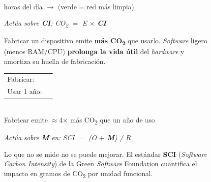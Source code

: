 \begin{figure}[htbp]
\begin{tcbraster}
\begin{tcolorbox}[
  title={Principio II -- \textit{Carbon-Aware Computing}},
  colbacktitle=practica4!80!black,
  colframe=practica4!70!black,
  colback=practica4!5
]
  \centering
  \colorbox{gray!25}{\rule{0pt}{12pt}\hspace{10pt}}%
  \colorbox{gray!25}{\rule{0pt}{12pt}\hspace{10pt}}%
  \colorbox{green!45}{\rule{0pt}{12pt}\hspace{10pt}}%
  \colorbox{green!45}{\rule{0pt}{12pt}\hspace{10pt}}%
  \colorbox{gray!25}{\rule{0pt}{12pt}\hspace{10pt}}\\[2pt]
  \tiny horas del d\'ia $\longrightarrow$ (verde = red m\'as limpia)
  \par\vspace{4pt}\raggedright
  \footnotesize\textit{Act\'ua sobre \textbf{CI}: CO\textsubscript{2} $=$ E $\times$ \textbf{CI}}
\end{tcolorbox}
\begin{tcolorbox}[
  title={Principio III -- \textit{Hardware} eficiente},
  colbacktitle=practica3!70!black,
  colframe=practica3!60!black,
  colback=practica3!5
]
  \small
  Fabricar un dispositivo emite \textbf{m\'as CO\textsubscript{2}} que usarlo.
  \textit{Software} ligero (menos RAM/CPU) \textbf{prolonga la vida \'util}
  del \textit{hardware} y amortiza su huella de fabricaci\'on.
  \vspace{6pt}\par
  \centering
  \begin{tabular}{ll}
    \tiny Fabricar:   & \colorbox{red!50}{\rule{0pt}{7pt}\hspace{52pt}} \\[3pt]
    \tiny Usar 1 año: & \colorbox{orange!40}{\rule{0pt}{7pt}\hspace{12pt}} \\
  \end{tabular}\\[2pt]
  \tiny Fabricar emite $\approx$4$\times$ más CO\textsubscript{2} que un año de uso
  \par\vspace{4pt}\raggedright
  \footnotesize\textit{Act\'ua sobre \textbf{M} en: SCI $=$ (O $+$ \textbf{M}) / R}
\end{tcolorbox}
\begin{tcolorbox}[
  title={Principio IV -- Medici\'on y transparencia},
  colbacktitle=gray!55,
  colframe=gray!50,
  colback=gray!4
]
  \small
  Lo que no se mide no se puede mejorar.
  El est\'andar \textbf{SCI} (\textit{Software Carbon Intensity})
  de la Green \textit{Software} Foundation cuantifica el impacto
  en gramos de CO\textsubscript{2} por unidad funcional.

\end{tcolorbox}
\end{tcbraster}
\end{figure}

